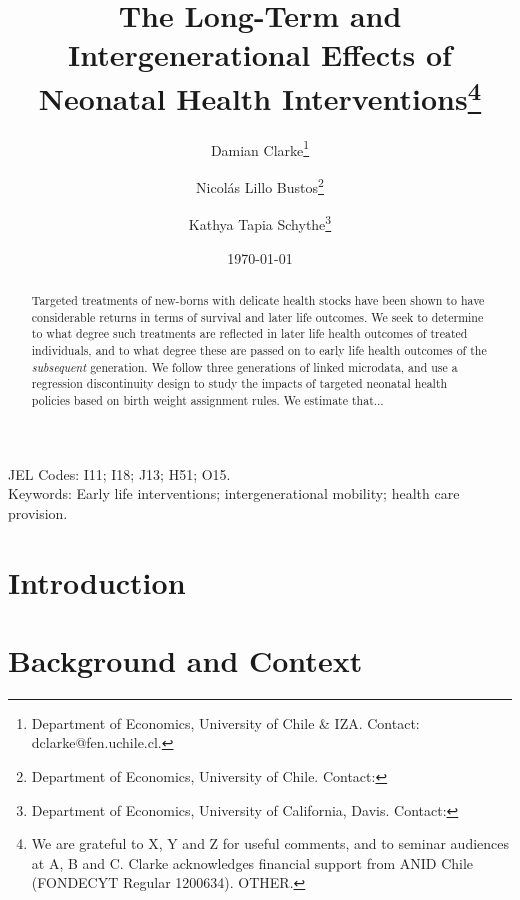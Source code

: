 \documentclass[11pt]{article}
\title{The Long-Term and Intergenerational Effects of Neonatal Health Interventions\thanks{We are grateful to X, Y and Z for useful comments, and to seminar audiences at A, B and C. Clarke acknowledges financial support from ANID Chile (FONDECYT Regular 1200634).  OTHER.  }}
\author{Damian Clarke\thanks{Department of Economics, University of Chile \& IZA.  Contact: dclarke@fen.uchile.cl.}
  \and Nicol\'as Lillo Bustos\thanks{Department of Economics, University of Chile.  Contact:}
  \and Kathya Tapia Schythe\thanks{Department of Economics, University of California, Davis.  Contact:}
}
\date{\today}
\begin{document}
\begin{spacing}{1.5}
  \maketitle

  \begin{abstract}
    Targeted treatments of new-borns with delicate health stocks have been shown to have considerable returns in terms of survival and later life outcomes.  We seek to determine to what degree such treatments are reflected in later life health outcomes of treated individuals, and to what degree these are passed on to early life health outcomes of the \emph{subsequent} generation.  We follow three generations of linked microdata, and use a regression discontinuity design to study the impacts of targeted neonatal health policies based on birth weight assignment rules.  We estimate that...
  \end{abstract}

  \noindent JEL Codes: I11; I18; J13; H51; O15. \\
  Keywords: Early life interventions; intergenerational mobility; health care provision. \\

  \clearpage

  \section{Introduction}

  \clearpage
  \section{Background and Context}
  \citet{Almondetal2010,Bharadwajetal2013}
  
  
  \clearpage

\end{spacing}
\end{document}

